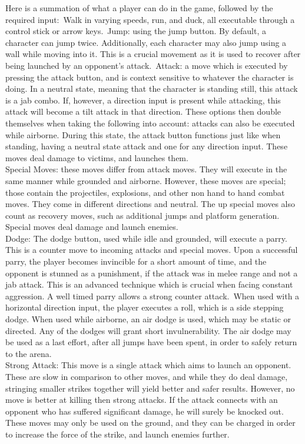 \documentclass[11pt]{article}
\begin{document}
Here is a summation of what a player can do in the game, followed by the required input:\
Walk in varying speeds, run, and duck, all executable through a control stick or arrow keys.\
Jump: using the jump button. By default, a character can jump twice. Additionally, each character may also jump using a wall while moving into it. This is a crucial movement as it is used to recover after being launched by an opponent's attack.\
Attack: a move which is executed by pressing the attack button, and is context sensitive to whatever the character is doing. In a neutral state, meaning that the character is standing still, this attack is a jab combo. If, however, a direction input is present while attacking, this attack will become a tilt attack in that direction. These options then double themselves when taking the following into account: attacks can also be executed while airborne. During this state, the attack button functions just like when standing, having a neutral state attack and one for any direction input. These moves deal damage to victims, and launches them.\\
Special Moves: these moves differ from attack moves. They will execute in the same manner while grounded and airborne. However, these moves are special; those contain the projectiles, explosions, and other non hand to hand combat moves. They come in different directions and neutral. The up special moves also count as recovery moves, such as additional jumps and platform generation. Special moves deal damage and launch enemies.\\
Dodge: The dodge button, used while idle and grounded, will execute a parry. This is a counter move to incoming attacks and special moves. Upon a successful parry, the player becomes invincible for a short amount of time, and the opponent is stunned as a punishment, if the attack was in melee range and not a jab attack. This is an advanced technique which is crucial when facing constant aggression. A well timed parry allows a strong counter attack.\
When used with a horizontal direction input, the player executes a roll, which is a side stepping dodge. When used while airborne, an air dodge is used, which may be static or directed. Any of the dodges will grant short invulnerability. The air dodge may be used as a last effort, after all jumps have been spent, in order to safely return to the arena.\\
Strong Attack: This move is a single attack which aims to launch an opponent. These are slow in comparison to other moves, and while they do deal damage, stringing smaller strikes together will yield better and safer results. However, no move is better at killing then strong attacks. If the attack connects with an opponent who has suffered significant damage, he will surely be knocked out. These moves may only be used on the ground, and they can be charged in order to increase the force of the strike, and launch enemies further.\\
\end{document}
